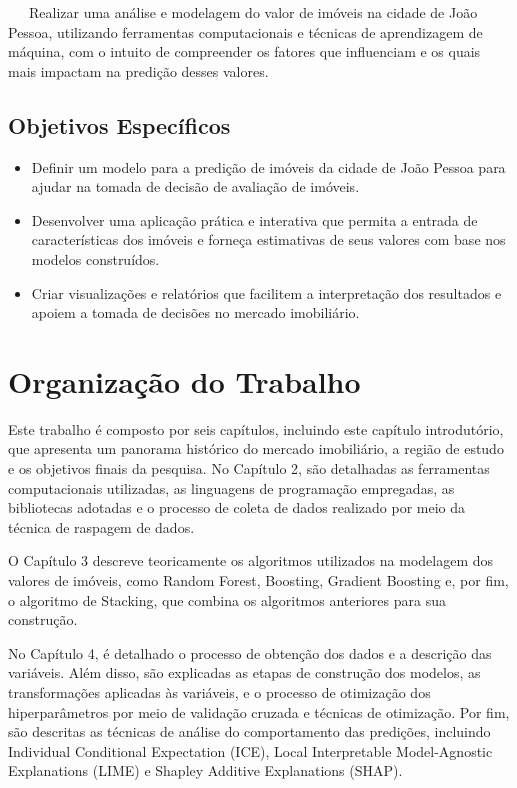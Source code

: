 \documentclass[
  12pt,
  a4paper,
]{scrreprt}
\begin{document}
~~~Realizar uma análise e modelagem do valor de imóveis na cidade de
João Pessoa, utilizando ferramentas computacionais e técnicas de
aprendizagem de máquina, com o intuito de compreender os fatores que
influenciam e os quais mais impactam na predição desses valores.

\subsection{Objetivos Específicos}\label{objetivos-especuxedficos}

\begin{itemize}
\item
  Definir um modelo para a predição de imóveis da cidade de João Pessoa
  para ajudar na tomada de decisão de avaliação de imóveis.
\item
  Desenvolver uma aplicação prática e interativa que permita a entrada
  de características dos imóveis e forneça estimativas de seus valores
  com base nos modelos construídos.
\item
  Criar visualizações e relatórios que facilitem a interpretação dos
  resultados e apoiem a tomada de decisões no mercado imobiliário.
\end{itemize}

\section{Organização do Trabalho}\label{organizauxe7uxe3o-do-trabalho}

Este trabalho é composto por seis capítulos, incluindo este capítulo
introdutório, que apresenta um panorama histórico do mercado
imobiliário, a região de estudo e os objetivos finais da pesquisa. No
Capítulo 2, são detalhadas as ferramentas computacionais utilizadas, as
linguagens de programação empregadas, as bibliotecas adotadas e o
processo de coleta de dados realizado por meio da técnica de raspagem de
dados.

\vspace{12pt}

O Capítulo 3 descreve teoricamente os algoritmos utilizados na modelagem
dos valores de imóveis, como Random Forest, Boosting, Gradient Boosting
e, por fim, o algoritmo de Stacking, que combina os algoritmos
anteriores para sua construção.

\vspace{12pt}

No Capítulo 4, é detalhado o processo de obtenção dos dados e a
descrição das variáveis. Além disso, são explicadas as etapas de
construção dos modelos, as transformações aplicadas às variáveis, e o
processo de otimização dos hiperparâmetros por meio de validação cruzada
e técnicas de otimização. Por fim, são descritas as técnicas de análise
do comportamento das predições, incluindo Individual Conditional
Expectation (ICE), Local Interpretable Model-Agnostic Explanations
(LIME) e Shapley Additive Explanations (SHAP).
\end{document}
